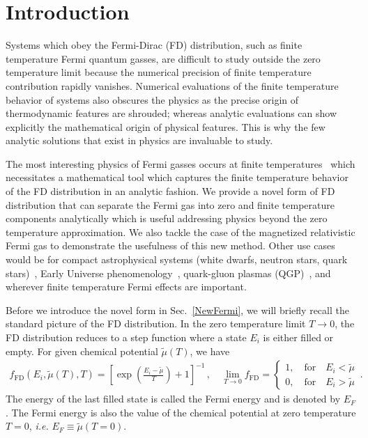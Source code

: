 \documentclass[sn-mathphys,Numbered]{sn-jnl}
\newcommand{\rsec}[1]{Sec.~{\ref{#1}}}
\newcommand*{\ar}{{\color{red}\text{ (Citation!) }}}
\begin{document}
\section{Introduction}
\label{sec1}
Systems which obey the Fermi-Dirac (FD) distribution, such as finite temperature Fermi quantum gasses, are difficult to study outside the zero temperature limit because the numerical precision of finite temperature contribution rapidly vanishes\ar. Numerical evaluations of the finite temperature behavior of systems also obscures the physics as the precise origin of thermodynamic features are shrouded; whereas analytic evaluations can show explicitly the mathematical origin of physical features. This is why the few analytic solutions that exist in physics are invaluable to study.

The most interesting physics of Fermi gasses occurs at finite temperatures~\cite{Elze:1980er} which necessitates a mathematical tool which captures the finite temperature behavior of the FD distribution in an analytic fashion. We provide a novel form of FD distribution that can separate the Fermi gas into zero and finite temperature components analytically which is useful addressing physics beyond the zero temperature approximation. We also tackle the case of the magnetized relativistic Fermi gas to demonstrate the usefulness of this new method. Other use cases would be for compact astrophysical systems (white dwarfs, neutron stars, quark stars)~\cite{Kaspi:2017fwg,Ferrer:2019xlr,Ferrer:2023pgq}, Early Universe phenomenology~\cite{Rafelski:2021aey,Rafelski:2023emw,Grayson:2023flr,Steinmetz:2023nsc}, quark-gluon plasmas (QGP)~\cite{Letessier:2002ony,Rafelski:2020ajx,Yang:2021bko}, and wherever finite temperature Fermi effects are important.

Before we introduce the novel form in \rsec{NewFermi}, we will briefly recall the standard picture of the FD distribution. In the zero temperature limit $T\to0$, the FD distribution reduces to a step function where a state $E_{i}$ is either filled or empty. For given chemical potential $\widetilde\mu(T)$, we have
\begin{align}
\label{f_old}
f_\mathrm{FD}(E_{i},\widetilde\mu(T),T)=\left[\exp\left(\frac{E_{i}-\widetilde\mu}{T}\right)+1\right]^{-1}\,,\quad
\lim_{T\to0}f_\mathrm{FD}=\left\{
\begin{array}{c}
1,\quad\mathrm{for}\quad{E_{i}}<\widetilde\mu\\
0,\quad\mathrm{for}\quad{E_{i}}>\widetilde\mu
\end{array}
\right.\,.
\end{align}
The energy of the last filled state is called the Fermi energy and is denoted by $E_F$. The Fermi energy is also the value of the chemical potential at zero temperature $T=0$, \emph{i.e.} $E_F\equiv\widetilde\mu(T = 0)$.
\end{document}
